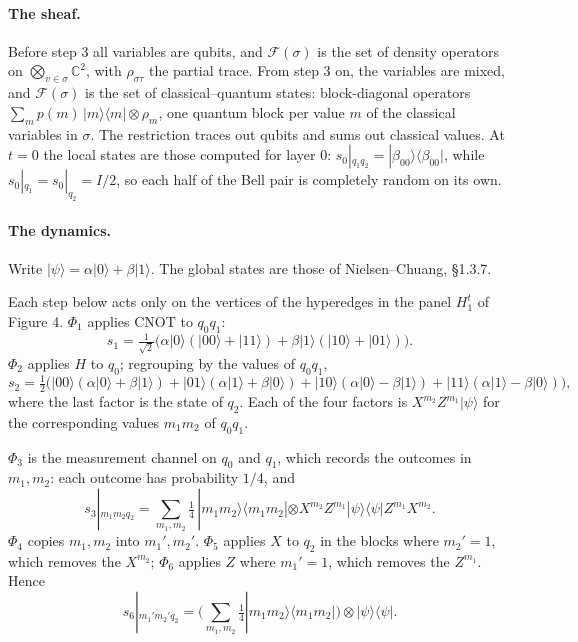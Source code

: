 \documentclass[11pt]{article}
\begin{document}
\paragraph{The sheaf.} Before step $3$ all variables are qubits, and $\mathcal{F}(\sigma)$ is the set of density operators on $\bigotimes_{v\in\sigma}\mathbb{C}^2$, with $\rho_{\sigma\tau}$ the partial trace. From step $3$ on, the variables are mixed, and $\mathcal{F}(\sigma)$ is the set of classical--quantum states: block-diagonal operators $\sum_m p(m)\,|m\rangle\langle m|\otimes\rho_m$, one quantum block per value $m$ of the classical variables in $\sigma$. The restriction traces out qubits and sums out classical values. At $t=0$ the local states are those computed for layer $0$: $s_0|_{q_1q_2}=|\beta_{00}\rangle\langle\beta_{00}|$, while $s_0|_{q_1}=s_0|_{q_2}=I/2$, so each half of the Bell pair is completely random on its own.

\paragraph{The dynamics.} Write $|\psi\rangle=\alpha|0\rangle+\beta|1\rangle$. The global states are those of Nielsen--Chuang, \S1.3.7.

Each step below acts only on the vertices of the hyperedges in the panel $H_1^t$ of Figure 4. $\Phi_1$ applies $\mathrm{CNOT}$ to $q_0q_1$:
\[ s_1=\tfrac{1}{\sqrt2}\big(\alpha|0\rangle(|00\rangle+|11\rangle)+\beta|1\rangle(|10\rangle+|01\rangle)\big). \]
$\Phi_2$ applies $H$ to $q_0$; regrouping by the values of $q_0q_1$,
\[ s_2=\tfrac12\Big(|00\rangle(\alpha|0\rangle+\beta|1\rangle)+|01\rangle(\alpha|1\rangle+\beta|0\rangle)+|10\rangle(\alpha|0\rangle-\beta|1\rangle)+|11\rangle(\alpha|1\rangle-\beta|0\rangle)\Big), \]
where the last factor is the state of $q_2$. Each of the four factors is $X^{m_2}Z^{m_1}|\psi\rangle$ for the corresponding values $m_1m_2$ of $q_0q_1$.

$\Phi_3$ is the measurement channel on $q_0$ and $q_1$, which records the outcomes in $m_1,m_2$: each outcome has probability $1/4$, and
\[ s_3|_{m_1m_2q_2}=\sum_{m_1,m_2}\tfrac14\,|m_1m_2\rangle\langle m_1m_2|\otimes X^{m_2}Z^{m_1}|\psi\rangle\langle\psi|Z^{m_1}X^{m_2}. \]
$\Phi_4$ copies $m_1,m_2$ into $m_1',m_2'$. $\Phi_5$ applies $X$ to $q_2$ in the blocks where $m_2'=1$, which removes the $X^{m_2}$; $\Phi_6$ applies $Z$ where $m_1'=1$, which removes the $Z^{m_1}$. Hence
\[ s_6|_{m_1'm_2'q_2}=\Big(\sum_{m_1,m_2}\tfrac14|m_1m_2\rangle\langle m_1m_2|\Big)\otimes|\psi\rangle\langle\psi|. \]
\end{document}
